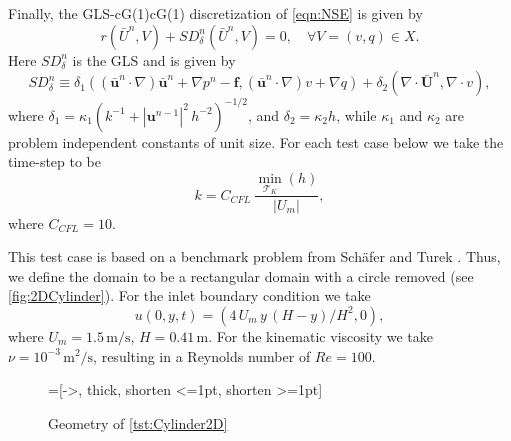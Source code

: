 Finally, the GLS-cG(1)cG(1) discretization of \eqref{eqn:NSE} is given by
\begin{equation}
  r(\bar{U}^n,V) + SD_{\delta}^n(\bar{U}^n,V) = 0, \quad \forall V=(v,q) \in X.
  \label{eqn:G2}
\end{equation}
Here $SD_{\delta}^n$ is the GLS and is given by
\begin{equation}
  SD_{\delta}^n \equiv
    \delta_1 (\left(\bar{\mathbf{u}}^n \cdot \nabla \right) \bar{\mathbf{u}}^n
        + \nabla p^n - \mathbf{f},
      \left(\bar{\mathbf{u}}^n \cdot \nabla \right) v + \nabla q)
      + \delta_2 (\nabla \cdot \bar{\mathbf{U}}^n, \nabla \cdot v),
  \label{eqn:NSEStabilization}
\end{equation}
where $\delta_1 = \kappa_1 (k^{-1} + |\mathbf{u}^{n-1}|^2\, h^{-2})^{-1/2}$, and
$\delta_2 = \kappa_2 h$, while $\kappa_1$ and $\kappa_2$ are problem independent
constants of unit size. For each test case below we take the time-step to be 
\begin{equation*}
  k = C_{CFL}\, \frac{\min_{\mathcal{T}_K}(h)}{|U_m|},
\end{equation*}
where $C_{CFL}=10$.

\begin{test} \label{tst:Cylinder2D}
  This test case is based on a benchmark problem from Sch\"afer and Turek
  \cite[Test case 2D-2]{Schaefer1996}. Thus, we define the domain to be a
  rectangular domain with a circle removed (see \autoref{fig:2DCylinder}). For
  the inlet boundary condition we take 
  \begin{equation}
    u(0,y,t) = (4\, U_m\,y\, (H - y)/H^2, 0),
    \label{eqn:2DInlet}
  \end{equation}
  where $U_m = 1.5\, \text{m/s}$, $H = 0.41\, \text{m}$. For the kinematic
  viscosity we take $\nu = 10^{-3}\, \text{m}^2\text{/s}$, resulting in a
  Reynolds number of $Re=100$.

  \begin{figure}[h]
    \centering
    =[->, thick, shorten <=1pt, shorten >=1pt]
    \caption{Geometry of \autoref{tst:Cylinder2D}}
    \label{fig:2DCylinder}
  \end{figure}
\end{test}


